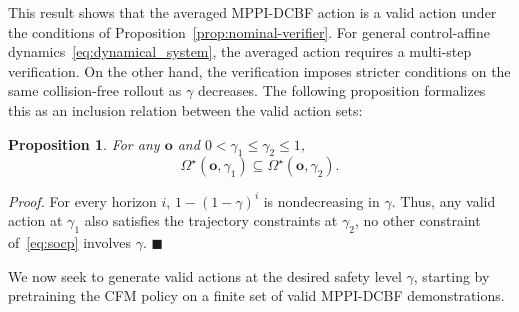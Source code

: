 \documentclass[letterpaper, 10 pt, conference]{ieeeconf}
\makeatletter
\renewcommand{\o}{\mathbf{o}}
\newcommand{\xk}{\mathbf{x}_{k}}
\newcommand{\uk}{\mathbf{u}_{k}}
\newtheorem{proposition}{Proposition}
\renewcommand{\subsection}{%
  \@startsection{subsection}{2}{\z@}%
  {4.5pt}%
  {2.5pt}%
  {\normalfont\normalsize\itshape}}
\makeatother
\begin{document}
This result shows that the averaged MPPI-DCBF action is a valid action under the conditions of Proposition~\ref{prop:nominal-verifier}. 
For general control-affine dynamics~\eqref{eq:dynamical_system}, the averaged action requires a multi-step verification. 
On the other hand, the verification imposes stricter conditions on the same collision-free rollout as $\gamma$ decreases.
The following proposition formalizes this as an inclusion relation between the valid action sets:
\begin{proposition}
\label{prop:gamma-effect}
For any $\o$ and
$0<\gamma_1\le\gamma_2\le1$,
\setlength{\abovedisplayskip}{2pt}
\setlength{\abovedisplayshortskip}{2pt}
\begin{equation}
\Omega^\star(\o,\gamma_1)
\subseteq
\Omega^\star(\o,\gamma_2).
\end{equation}
\end{proposition}
\noindent\emph{Proof.}
For every horizon $i$,
$1-(1-\gamma)^i$ is nondecreasing in $\gamma$.
Thus, any valid action at $\gamma_1$ also satisfies the trajectory constraints at $\gamma_2$, no other constraint of~\eqref{eq:socp} involves $\gamma$. \hfill$\blacksquare$

We now seek to generate valid actions at the desired safety level $\gamma$, starting by pretraining the CFM policy on a finite set of valid MPPI-DCBF demonstrations.
\end{document}

